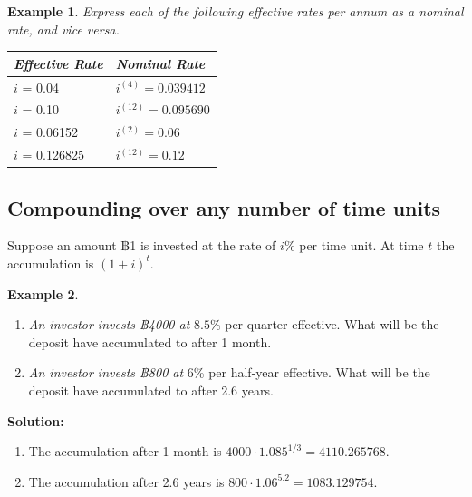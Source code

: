 \documentclass[
]{book}
\theoremstyle{definition}
\theoremstyle{definition}
\newtheorem{example}{Example}[chapter]
\theoremstyle{definition}
\theoremstyle{definition}
\theoremstyle{remark}
\begin{document}
\begin{example}

\emph{Express each of the following effective rates per annum as a nominal
rate, and vice versa.}

\begin{longtable}[]{@{}ll@{}}
\toprule()
\textbf{\emph{Effective Rate}} & \textbf{\emph{Nominal Rate}} \\
\midrule()
\endhead
\(i\) = 0.04 & \(i^{(4)} = 0.039412\) \\
\(i\) = 0.10 & \(i^{(12)} = 0.095690\) \\
\(i\) = 0.06152 & \(i^{(2)} = 0.06\) \\
\(i\) = 0.126825 & \(i^{(12)} = 0.12\) \\
\bottomrule()
\end{longtable}

\end{example}

\hypertarget{compounding-over-any-number-of-time-units}{%
\subsection{Compounding over any number of time units}\label{compounding-over-any-number-of-time-units}}

Suppose an amount ฿1 is invested at the rate of \(i\)\% per time unit. At
time \(t\) the accumulation is \((1 + i)^t\).

\begin{example}

\begin{enumerate}
\def\labelenumi{\arabic{enumi}.}
\item
  \emph{An investor invests ฿4000 at} \(8.5\)\% per quarter effective. What
  will be the deposit have accumulated to after 1 month.
\item
  \emph{An investor invests ฿800 at} \(6\)\% per half-year effective. What
  will be the deposit have accumulated to after 2.6 years.
\end{enumerate}

\end{example}

\textbf{Solution:}

\begin{enumerate}
\def\labelenumi{\arabic{enumi}.}
\item
  The accumulation after 1 month is
  \(4000 \cdot 1.085^{1/3} = 4110.265768.\)
\item
  The accumulation after 2.6 years is
  \(800 \cdot 1.06^{5.2} = 1083.129754.\)
\end{enumerate}
\end{document}
